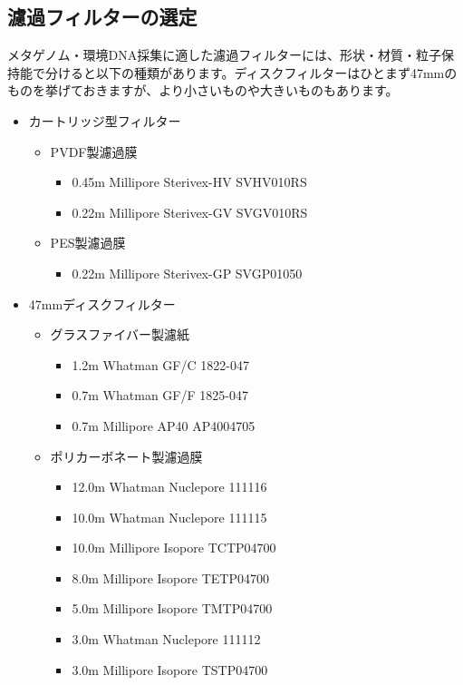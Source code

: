 \documentclass[titlepage,10pt,a4paper,uplatex]{jsbook}
\begin{document}
\subsection{濾過フィルターの選定}

メタゲノム・環境DNA採集に適した濾過フィルターには、形状・材質・粒子保持能で分けると以下の種類があります。ディスクフィルターはひとまず47mmのものを挙げておきますが、より小さいものや大きいものもあります。

\begin{itemize}
\item カートリッジ型フィルター
\begin{itemize}
\item PVDF製濾過膜
\begin{itemize}
\item 0.45{\textmu}m Millipore Sterivex-HV SVHV010RS
\item 0.22{\textmu}m Millipore Sterivex-GV SVGV010RS
\end{itemize}
\item PES製濾過膜
\begin{itemize}
\item 0.22{\textmu}m Millipore Sterivex-GP SVGP01050
\end{itemize}
\end{itemize}
\item 47mmディスクフィルター
\begin{itemize}
\item グラスファイバー製濾紙
\begin{itemize}
\item 1.2{\textmu}m Whatman GF/C 1822-047
\item 0.7{\textmu}m Whatman GF/F 1825-047
\item 0.7{\textmu}m Millipore AP40 AP4004705
\end{itemize}
\item ポリカーボネート製濾過膜
\begin{itemize}
\item 12.0{\textmu}m Whatman Nuclepore 111116
\item 10.0{\textmu}m Whatman Nuclepore 111115
\item 10.0{\textmu}m Millipore Isopore TCTP04700
\item 8.0{\textmu}m Millipore Isopore TETP04700
\item 5.0{\textmu}m Millipore Isopore TMTP04700
\item 3.0{\textmu}m Whatman Nuclepore 111112
\item 3.0{\textmu}m Millipore Isopore TSTP04700

\end{itemize}
\end{itemize}
\end{itemize}
\end{document}
